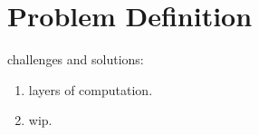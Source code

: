 \section{Problem Definition}

challenges and solutions:

\begin{enumerate}
\item layers of computation.
\item wip.    
\end{enumerate}
